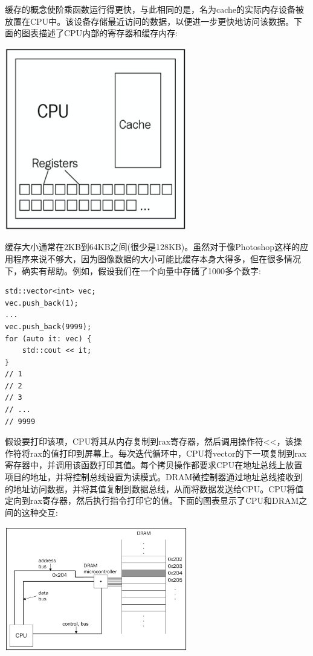 缓存的概念使阶乘函数运行得更快，与此相同的是，名为cache的实际内存设备被放置在CPU中。该设备存储最近访问的数据，以便进一步更快地访问该数据。下面的图表描述了CPU内部的寄存器和缓存内存: \par

\begin{center}
	\includegraphics[width=0.6\textwidth]{content/Section-1/Chapter-5/7}
\end{center}

缓存大小通常在2KB到64KB之间(很少是128KB)。虽然对于像Photoshop这样的应用程序来说不够大，因为图像数据的大小可能比缓存本身大得多，但在很多情况下，确实有帮助。例如，假设我们在一个向量中存储了1000多个数字: \par

\begin{lstlisting}[caption={}]
std::vector<int> vec;
vec.push_back(1);
...
vec.push_back(9999);
for (auto it: vec) {
	std::cout << it;
}
// 1
// 2
// 3
// ...
// 9999
\end{lstlisting}

假设要打印该项，CPU将其从内存复制到rax寄存器，然后调用操作符<<，该操作符将rax的值打印到屏幕上。每次迭代循环中，CPU将vector的下一项复制到rax寄存器中，并调用该函数打印其值。每个拷贝操作都要求CPU在地址总线上放置项目的地址，并将控制总线设置为读模式。DRAM微控制器通过地址总线接收到的地址访问数据，并将其值复制到数据总线，从而将数据发送给CPU。CPU将值定向到rax寄存器，然后执行指令打印它的值。下面的图表显示了CPU和DRAM之间的这种交互: \par

\begin{center}
	\includegraphics[width=0.6\textwidth]{content/Section-1/Chapter-5/8}
\end{center}

